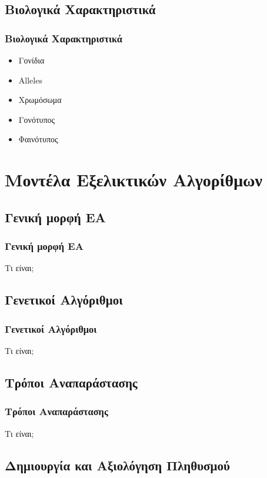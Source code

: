 \documentclass[xetex,mathserif,serif,14pt]{beamer}
\begin{document}
\subsection{Βιολογικά Χαρακτηριστικά}

\begin{frame}
\frametitle{Βιολογικά Χαρακτηριστικά}
    \begin{itemize}
      \item Γονίδια
      \item Alleles
      \item Χρωμόσωμα
      \item Γονότυπος
      \item Φαινότυπος      
    \end{itemize}
\end{frame}

\section{Μοντέλα Εξελικτικών Αλγορίθμων}

\subsection{Γενική μορφή ΕΑ}

\begin{frame}
\frametitle{Γενική μορφή ΕΑ}
Τι είναι;
\end{frame}

\subsection{Γενετικοί Αλγόριθμοι}

\begin{frame}
\frametitle{Γενετικοί Αλγόριθμοι}
Τι είναι;
\end{frame}

\subsection{Τρόποι Αναπαράστασης}

\begin{frame}
\frametitle{Τρόποι Αναπαράστασης}
Τι είναι;
\end{frame}

\subsection{Δημιουργία και Αξιολόγηση Πληθυσμού}
\end{document}
